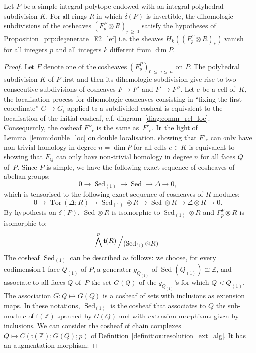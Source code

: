 \documentclass[AHL,Unicode,longabstracts,published]{cedram}
\newcommand{\bigslant}[2]{{\raisebox{.2em}{$#1$}\left/\raisebox{-.2em}{$#2$}\right.}}
\newcommand{\Z}{\mathbb{Z}}
\renewcommand{\t}{\mathfrak{t}}
\DeclareMathOperator{\Sed}{Sed}
\DeclareMathOperator{\Tor}{Tor}
\begin{document}
\begin{prop}\label{prop:preparation_F0_1st_position}
Let $P$ be a simple integral polytope endowed with an integral polyhedral subdivision $K$. For all rings $R$ in which $\delta(P)$ is invertible, the dihomologic subdivisions of the cosheaves $(F^{P}_p\otimes R)_{p\,\geq\,0}$ satisfy the hypotheses of Proposition~\ref{prp:degenerate_E2_lef} i.e. the sheaves $H_k((F^{P}_p\otimes R)_*)$ vanish for all integers $p$ and all integers $k$ different from $\dim P$.
\end{prop}

\begin{proof}
Let $F$ denote one of the cosheaves $(F^P_p)_{0\,\leq \,p\,\leq\,n}$ on $P$. The polyhedral subdivision $K$ of $P$ first and then its dihomologic subdivision give rise to two consecutive subdivisions of cosheaves $F\mapsto F'$ and $F'\mapsto F''$. Let $e$ be a cell of~$K$, the localisation process for dihomologic cosheaves consisting in ``fixing the first coordinate'' $G\mapsto G_e$ applied to a subdivided cosheaf is equivalent to the localisation of the initial cosheaf, c.f. diagram~\eqref{diag:comm_rel_loc}. Consequently, the cosheaf $F''_e$ is the same as~$F'_e$. In the light of Lemma~\ref{lemm:double_loc} on double localisation, showing that $F'_e$ can only have non-trivial homology in degree $n=\dim P$ for all cells $e\in K$ is equivalent to showing that $F_Q$ can only have non-trivial homology in degree $n$ for all faces $Q$ of~$P$. Since $P$ is simple, we have the following exact sequence of cosheaves of abelian groups:
\begin{equation*}
0\rightarrow \Sed_{(1)} \rightarrow \Sed \rightarrow \Delta \rightarrow 0,
\end{equation*}
which is tensorised to the following exact sequence of cosheaves of $R$-modules:
\begin{equation*}
0 \rightarrow \Tor(\Delta;R) \rightarrow \Sed_{(1)}\otimes R \rightarrow \Sed \otimes R \rightarrow \Delta \otimes R\rightarrow 0.
\end{equation*}
By hypothesis on $\delta(P)$, $\Sed\otimes R$ is isomorphic to $\Sed_{(1)}\otimes R$ and $F^{P}_p\otimes R$ is isomorphic to:
\begin{equation*}
\bigwedge^p \bigslant{\t(R)}{(\Sed_{(1)}\otimes R)}.
\end{equation*}
The cosheaf $\Sed_{(1)}$ can be described as follows: we choose, for every codimension\,$1$ face ${Q_{(1)}}$ of $P$, a generator $g_{Q_{(1)}}$ of $\Sed({Q_{(1)}})\cong \Z$, and associate to all faces $Q$ of~$P$ the set $G(Q)$ of the $g_{Q_{(1)}}$'s for which $Q<{Q_{(1)}}$. The association $G:Q\mapsto G(Q)$ is a cosheaf of sets with inclusions as extension maps. In these notations, $\Sed_{(1)}$ is the cosheaf that associates to $Q$ the sub-module of $\t(\Z)$ spanned by $G(Q)$ and with extension morphisms given by inclusions. We can consider the cosheaf of chain complexes $Q\mapsto C(\t(\Z);G(Q);p)$ of Definition~\ref{definition:resolution_ext_alg}. It has an augmentation morphism:

\end{proof}
\end{document}
